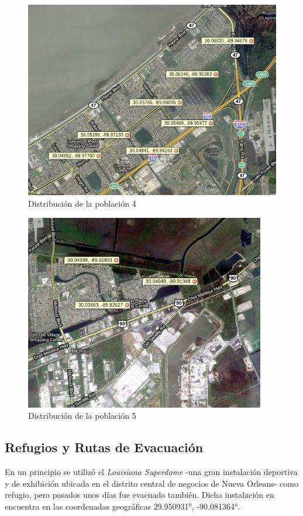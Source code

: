 \begin{figure}[H]
 \centering
 \includegraphics[width=120mm]{figuras/cap6/population2.png}
 \caption{Distribución de la población 4}
\end{figure}

\begin{figure}[H]
 \centering
 \includegraphics[width=105mm]{figuras/cap6/population3.png}
 \caption{Distribución de la población 5}
\end{figure}

\subsection{Refugios y Rutas de Evacuación}

En un principio se utilizó el {\em Louisiana Superdome} -una gran instalación
deportiva y de exhibición ubicada en el distrito central de negocios de Nueva
Orleans- como refugio, pero pasados unos días fue evacuado también. Dicha
instalación en encuentra en las coordenadas geográficas 29.950931°, -90.081364°.

